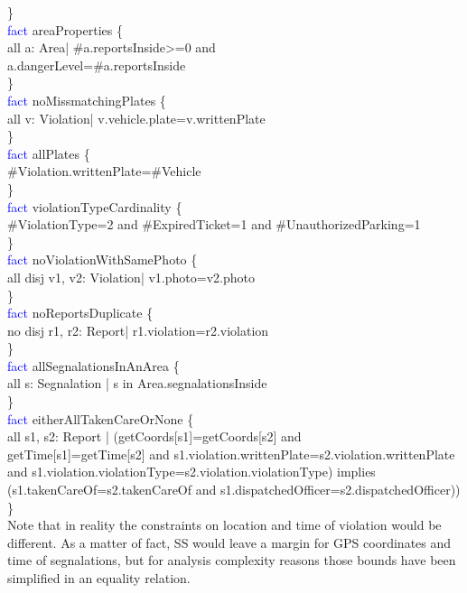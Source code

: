 \}\\
\textcolor{blue}{fact}
\textcolor{mycolor}{areaProperties} \{\\
all a: Area| \#a.reportsInside>=0 and\\ a.dangerLevel=\#a.reportsInside\\
\}\\
\textcolor{blue}{fact}
\textcolor{mycolor}{noMissmatchingPlates} \{\\
all v: Violation| v.vehicle.plate=v.writtenPlate\\
\}\\
\textcolor{blue}{fact}
\textcolor{mycolor}{allPlates} \{\\
\#Violation.writtenPlate=\#Vehicle\\
\}\\
\textcolor{blue}{fact}
\textcolor{mycolor}{violationTypeCardinality} \{\\
\#ViolationType=2 and \#ExpiredTicket=1 and \#UnauthorizedParking=1\\
\}\\
\textcolor{blue}{fact}
\textcolor{mycolor}{noViolationWithSamePhoto} \{\\
all disj v1, v2: Violation| v1.photo=v2.photo\\
\}\\
\textcolor{blue}{fact}
\textcolor{mycolor}{noReportsDuplicate} \{\\
no disj r1, r2: Report| r1.violation=r2.violation\\
\}\\
\textcolor{blue}{fact}
\textcolor{mycolor}{allSegnalationsInAnArea} \{\\
all s: Segnalation | s in Area.segnalationsInside\\
\}\\
\textcolor{blue}{fact}
\textcolor{mycolor}{eitherAllTakenCareOrNone} \{\\
all s1, s2: Report | (getCoords[s1]=getCoords[s2] and\\ getTime[s1]=getTime[s2] and s1.violation.writtenPlate=s2.violation.writtenPlate \\
and s1.violation.violationType=s2.violation.violationType) implies\\ (s1.takenCareOf=s2.takenCareOf and s1.dispatchedOfficer=s2.dispatchedOfficer))\\
\}\\
Note that in reality the constraints on location and time of violation would be different. As a matter of fact, SS would leave a margin for GPS coordinates and time of segnalations, but for analysis complexity reasons those bounds have been simplified in an equality relation.\\
